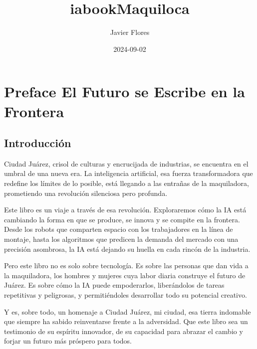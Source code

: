 \documentclass[
  letterpaper,
]{book}
\title{iabookMaquiloca}
\author{Javier Flores}
\date{2024-09-02}
\renewcommand*\contentsname{Table of contents}
\newcommand\contentsname{Table of contents}
\begin{document}
\frontmatter
\maketitle

\renewcommand*\contentsname{Table of contents}
{
\hypersetup{linkcolor=}
\setcounter{tocdepth}{2}
\tableofcontents
}

\mainmatter
{}

\chapter*{Preface El Futuro se Escribe en la
Frontera}\label{preface-el-futuro-se-escribe-en-la-frontera}


\section*{Introducción}\label{introducciuxf3n}


Ciudad Juárez, crisol de culturas y encrucijada de industrias, se
encuentra en el umbral de una nueva era. La inteligencia artificial, esa
fuerza transformadora que redefine los límites de lo posible, está
llegando a las entrañas de la maquiladora, prometiendo una revolución
silenciosa pero profunda.

Este libro es un viaje a través de esa revolución. Exploraremos cómo la
IA está cambiando la forma en que se produce, se innova y se compite en
la frontera. Desde los robots que comparten espacio con los trabajadores
en la línea de montaje, hasta los algoritmos que predicen la demanda del
mercado con una precisión asombrosa, la IA está dejando su huella en
cada rincón de la industria.

Pero este libro no es solo sobre tecnología. Es sobre las personas que
dan vida a la maquiladora, los hombres y mujeres cuya labor diaria
construye el futuro de Juárez. Es sobre cómo la IA puede empoderarlos,
liberándolos de tareas repetitivas y peligrosas, y permitiéndoles
desarrollar todo su potencial creativo.

Y es, sobre todo, un homenaje a Ciudad Juárez, mi ciudad, esa tierra
indomable que siempre ha sabido reinventarse frente a la adversidad. Que
este libro sea un testimonio de su espíritu innovador, de su capacidad
para abrazar el cambio y forjar un futuro más próspero para todos.
\end{document}
